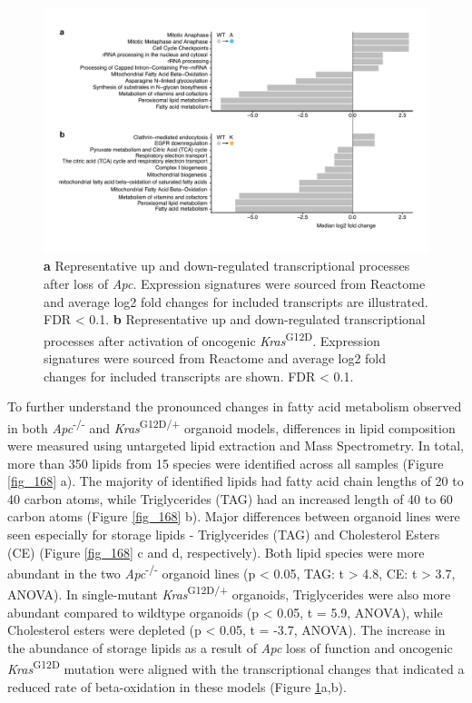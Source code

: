 \begin{flushleft}
\begin{figure}[h]
\centering
\includegraphics[width=\textwidth,
                height=\textheight,
                keepaspectratio]{figures/adenomaprofiling/pdf/fig_1_6_2.pdf}
\caption[Representative up and down-regulated transcriptional processes after loss of \textit{Apc} and activation of oncogenic \textit{Kras}\textsuperscript{G12D}]{
\textbf{a} Representative up and down-regulated transcriptional processes after loss of \textit{Apc}. Expression signatures were sourced from Reactome and average log2 fold changes for included transcripts are illustrated. FDR < 0.1.
\textbf{b} Representative up and down-regulated transcriptional processes after activation of oncogenic \textit{Kras}\textsuperscript{G12D}. Expression signatures were sourced from Reactome and average log2 fold changes for included transcripts are shown. FDR < 0.1.
}
\label{fig_162}
\end{figure}
\bigbreak

To further understand the pronounced changes in fatty acid metabolism observed in both \textit{Apc}\textsuperscript{-/-}  and \textit{Kras}\textsuperscript{G12D/+} organoid models, differences in lipid composition were measured using untargeted lipid extraction and Mass Spectrometry. In total, more than 350 lipids from 15 species were identified across all samples (Figure \ref{fig_168} a). The majority of identified lipids had fatty acid chain lengths of 20 to 40 carbon atoms, while Triglycerides (TAG) had an increased length of 40 to 60 carbon atoms (Figure \ref{fig_168} b). Major differences between organoid lines were seen especially for storage lipids - Triglycerides (TAG) and Cholesterol Esters (CE) (Figure \ref{fig_168} c and d, respectively). Both lipid species were more abundant in the two \textit{Apc}\textsuperscript{-/-}  organoid lines (p < 0.05, TAG: t > 4.8, CE: t > 3.7, ANOVA). In single-mutant \textit{Kras}\textsuperscript{G12D/+} organoids, Triglycerides were also more abundant compared to wildtype organoids (p < 0.05, t = 5.9, ANOVA), while Cholesterol esters were depleted (p < 0.05, t = -3.7, ANOVA). The increase in the abundance of storage lipids as a result of \textit{Apc} loss of function and oncogenic \textit{Kras}\textsuperscript{G12D} mutation were aligned with the transcriptional changes that indicated a reduced rate of beta-oxidation in these models (Figure \ref{fig_162}a,b). 


\end{flushleft}
